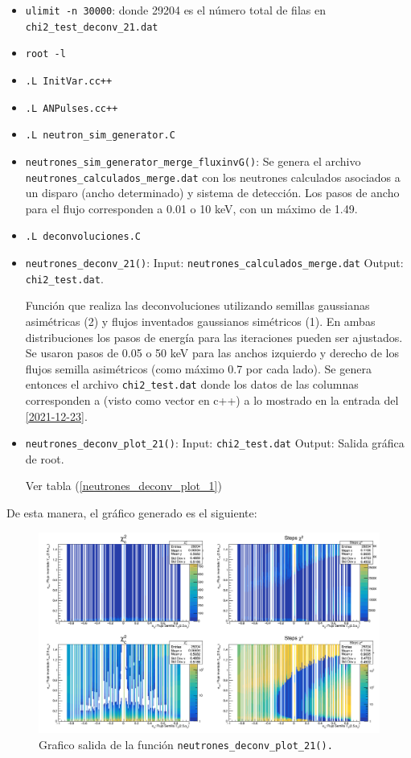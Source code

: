 \documentclass[11pt,letterpaper]{article}
\begin{document}
\begin{itemize}
\item \verb|ulimit -n 30000|: donde 29204 es el número total de filas en \verb|chi2_test_deconv_21.dat|
\item \verb|root -l|
\item \verb|.L InitVar.cc++|
\item \verb|.L ANPulses.cc++|
\item \verb|.L neutron_sim_generator.C|
\item \verb|neutrones_sim_generator_merge_fluxinvG()|: Se genera el archivo \verb|neutrones_calculados_merge.dat| con los neutrones calculados asociados a un disparo (ancho determinado) y sistema de detección. Los pasos de ancho para el flujo corresponden a 0.01 o 10 keV, con un máximo de 1.49.
\item \verb|.L deconvoluciones.C|
\item \verb|neutrones_deconv_21()|: 
Input: \verb|neutrones_calculados_merge.dat| Output:  \verb|chi2_test.dat|.

Función que realiza las deconvoluciones utilizando semillas gaussianas asimétricas (2) y flujos inventados gaussianos simétricos (1). En ambas distribuciones los pasos de energía para las iteraciones pueden ser ajustados. Se usaron pasos de 0.05 o 50 keV para las anchos izquierdo y derecho de los flujos semilla asimétricos (como máximo 0.7 por cada lado). Se genera entonces el archivo \verb|chi2_test.dat| donde los datos de las columnas corresponden a (visto como vector en c++) a lo mostrado en la entrada del \ref{2021-12-23}.
\item \verb|neutrones_deconv_plot_21()|: Input: \verb|chi2_test.dat| Output: Salida gráfica de root.

Ver tabla (\ref{neutrones_deconv_plot_1})
\end{itemize}

De esta manera, el gráfico generado es el siguiente:

\begin{figure}[H]
    \includegraphics[width=1.\textwidth]{img/plot_deconv_21_fail_01.png}
    \centering
     \cprotect\caption{Grafico salida de la función \verb|neutrones_deconv_plot_21().|} 
\label{neutrones_deconv_plot_21_fail}
\end{figure}
\end{document}
